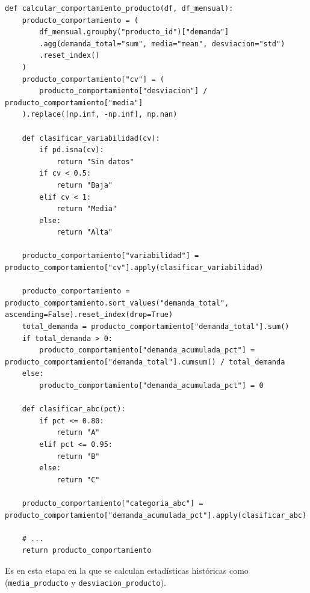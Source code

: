 \label{lst:segmentacion}
\begin{verbatim}
def calcular_comportamiento_producto(df, df_mensual):
    producto_comportamiento = (
        df_mensual.groupby("producto_id")["demanda"]
        .agg(demanda_total="sum", media="mean", desviacion="std")
        .reset_index()
    )
    producto_comportamiento["cv"] = (
        producto_comportamiento["desviacion"] / producto_comportamiento["media"]
    ).replace([np.inf, -np.inf], np.nan)

    def clasificar_variabilidad(cv):
        if pd.isna(cv):
            return "Sin datos"
        if cv < 0.5:
            return "Baja"
        elif cv < 1:
            return "Media"
        else:
            return "Alta"

    producto_comportamiento["variabilidad"] = producto_comportamiento["cv"].apply(clasificar_variabilidad)

    producto_comportamiento = producto_comportamiento.sort_values("demanda_total", ascending=False).reset_index(drop=True)
    total_demanda = producto_comportamiento["demanda_total"].sum()
    if total_demanda > 0:
        producto_comportamiento["demanda_acumulada_pct"] = producto_comportamiento["demanda_total"].cumsum() / total_demanda
    else:
        producto_comportamiento["demanda_acumulada_pct"] = 0

    def clasificar_abc(pct):
        if pct <= 0.80:
            return "A"
        elif pct <= 0.95:
            return "B"
        else:
            return "C"

    producto_comportamiento["categoria_abc"] = producto_comportamiento["demanda_acumulada_pct"].apply(clasificar_abc)

    # ...
    return producto_comportamiento
\end{verbatim}

Es en esta etapa en la que se calculan estadísticas históricas como (\texttt{media\_producto} y \texttt{desviacion\_producto}).
